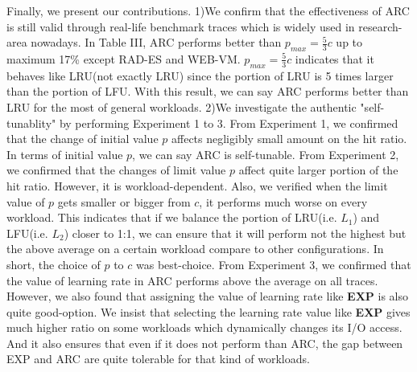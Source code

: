 Finally, we present our contributions. 1)We confirm that the effectiveness of ARC is still valid through real-life benchmark traces which is widely used in research-area nowadays. In Table III, ARC performs better than $p_{max}=\frac{5}{3}c$ up to maximum 17\% except RAD-ES and WEB-VM. $p_{max}=\frac{5}{3}c$ indicates that it behaves like LRU(not exactly LRU) since the portion of LRU is 5 times larger than the portion of LFU. With this result, we can say ARC performs better than LRU for the most of general workloads. 2)We investigate the authentic "self-tunablity" by performing Experiment 1 to 3. From Experiment 1, we confirmed that the change of initial value $p$ affects negligibly small amount on the hit ratio. In terms of initial value $p$, we can say ARC is self-tunable. From Experiment 2, we confirmed that the changes of limit value $p$ affect quite larger portion of the hit ratio. However, it is workload-dependent. Also, we verified when the limit value of $p$ gets smaller or bigger from $c$, it performs much worse on every workload. This indicates that if we balance the portion of LRU(i.e. $L_1$) and LFU(i.e. $L_2$) closer to 1:1, we can ensure that it will perform not the highest but the above average on a certain workload compare to other configurations. In short, the choice of $p$ to $c$ was best-choice.
From Experiment 3, we confirmed that the value of learning rate in ARC performs above the average on all traces. However, we also found that assigning the value of learning rate like \textbf{EXP} is also quite good-option. We insist that selecting the learning rate value like \textbf{EXP} gives much higher ratio on some workloads which dynamically changes its I/O access. And it also ensures that even if it does not perform than ARC, the gap between EXP and ARC are quite tolerable for that kind of workloads.



